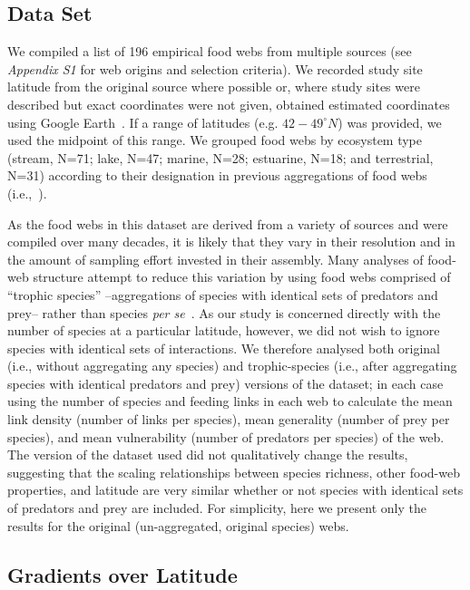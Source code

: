 \documentclass[12pt]{article}
\begin{document}
  \subsection*{Data Set} 

    We compiled a list of 196 empirical food webs from
    multiple sources (see \emph{Appendix S1} for web origins and selection
    criteria). We recorded study site latitude from the original source where
    possible or, where study sites were described but exact coordinates were not
    given, obtained estimated coordinates using Google Earth~\cite{GoogleEarth}.
    If a range of latitudes (e.g. $42-49^{\circ}N$) was provided, we used the midpoint
    of this range. We grouped food webs by ecosystem type (stream, N=71; lake, N=47; marine, 
    N=28; estuarine, N=18; and terrestrial, N=31) according to their designation in 
    previous aggregations of food webs (i.e.,~\cite{GlobalWeb,Riede2011,Dunne2013}).


    As the food webs in this dataset are derived from a variety of sources and were compiled over many decades, it
    is likely that they vary in their resolution and in the amount of sampling effort invested in their assembly.
    Many analyses of food-web structure attempt to reduce this variation by using food webs comprised of ``trophic
    species'' --aggregations of species with identical sets of predators and prey-- rather than  
    species \emph{per se}~\cite{Martinez1991,Dunne2004,Vermaat2009,Dunne2013}. As our study
    is concerned directly with the number of species at a particular latitude, however, we did not wish to ignore 
    species with identical sets of interactions. We therefore analysed both original (i.e., without aggregating 
    any species) and trophic-species (i.e., after aggregating species with identical predators and prey) versions
    of the dataset; in each case using the number of species and 
    feeding links in each web to calculate the mean link density (number of links per species), mean generality 
    (number of prey per species), and mean vulnerability (number of predators per species) of the web. 
    The version of the dataset used did not qualitatively change the results, suggesting that
    the scaling relationships between species richness, other food-web properties, and latitude are very 
    similar whether or not species with identical sets of predators and prey are included. For simplicity, 
    here we present only the results for the original (un-aggregated, original species) webs.


  \subsection*{Gradients over Latitude}
\end{document}

